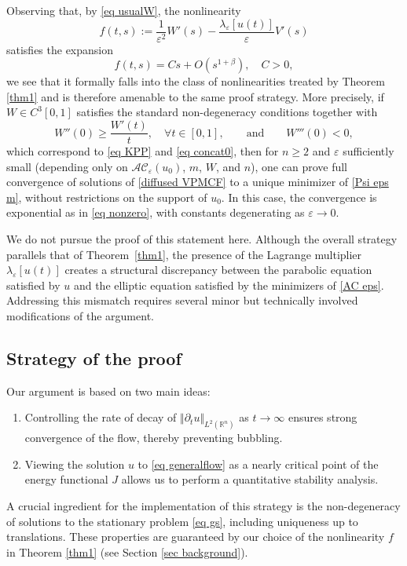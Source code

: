 \documentclass[11pt,letterpaper,reqno]{amsart}
\newcommand{\R}{\mathbb{R}}
\newcommand{\e}{\varepsilon}
\theoremstyle{plain}%
\theoremstyle{definition}
\numberwithin{equation}{section}
\numberwithin{figure}{section}
\begin{document}
Observing that, by \eqref{eq usualW}, the nonlinearity
\[
f(t,s) := \frac{1}{\varepsilon^2} W'(s) - \frac{\lambda_\varepsilon[u(t)]}{\varepsilon} V'(s)
\]
satisfies the expansion
\[
f(t,s) = C s + O(s^{1+\beta}), \quad C>0,
\]
we see that it formally falls into the class of nonlinearities treated by Theorem \ref{thm1} and is therefore amenable to the same proof strategy. More precisely, if $W \in C^3[0,1]$ satisfies the standard non-degeneracy conditions together with
\begin{equation}\label{eq assumtion convexity}
W''(0) \ge \frac{W'(t)}{t}, \quad \forall t \in [0,1], 
\qquad \text{and} \qquad W'''(0) < 0,
\end{equation}
which correspond to \eqref{eq KPP} and \eqref{eq concat0}, then for $n \ge 2$ and $\varepsilon$ sufficiently small (depending only on $\mathcal{AC}_\e(u_0)$, $m$, $W$, and $n$), one can prove full convergence of solutions of \eqref{diffused VPMCF} to a unique minimizer of \eqref{Psi eps m}, without restrictions on the support of $u_0$. In this case, the convergence is exponential as in \eqref{eq nonzero}, with constants degenerating as $\varepsilon \to 0$.

We do not pursue the proof of this statement here. Although the overall strategy parallels that of Theorem~\ref{thm1}, the presence of the Lagrange multiplier $\lambda_\e[u(t)]$ creates a structural discrepancy between the parabolic equation satisfied by $u$ and the elliptic equation satisfied by the minimizers of \eqref{AC eps}. Addressing this mismatch requires several minor but technically involved modifications of the argument.



\subsection{Strategy of the proof}\label{ss:mainresults}

Our argument is based on two main ideas: 
\begin{enumerate}
    \item[(1)] Controlling the rate of decay of $\Vert \partial_t u\Vert_{L^2(\R^n)}$ as $t \to \infty$ ensures strong convergence of the flow, thereby preventing bubbling.
    \item[(2)] Viewing the solution $u$ to \eqref{eq generalflow} as a nearly critical point of the energy functional $J$ allows us to perform a quantitative stability analysis.
\end{enumerate}
A crucial ingredient for the implementation of this strategy is the non-degeneracy of solutions to the stationary problem \eqref{eq gs}, including uniqueness up to translations. These properties are guaranteed by our choice of the nonlinearity $f$ in Theorem \ref{thm1} (see Section \ref{sec background}).\\
\end{document}
